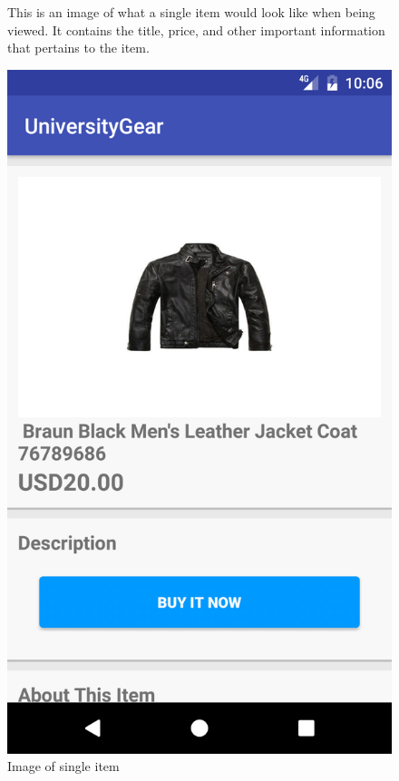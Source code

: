 \documentclass[journal,compsoc, 10pt, draftclsnofoot, onecolumn]{IEEEtran}
\begin{document}
\begin{figure}[t]
This is an image of what a single item would look like when being viewed. 
It contains the title, price, and other important information that pertains to 
the item.
\centering
\caption{Image of single item}
\includegraphics[scale=.2]{singleview1}
\end{figure}
\end{document}
